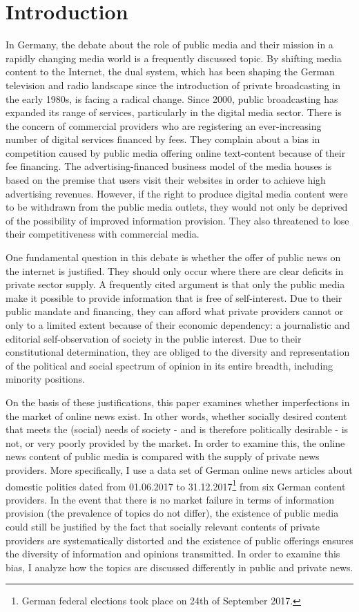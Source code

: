 \documentclass[12pt,a4paper,notitlepage]{article}
\begin{document}
\section{Introduction}

In Germany, the debate about the role of public media and their mission in a rapidly changing media world is a frequently discussed topic. By shifting media content to the Internet, the dual system, which has been shaping the German television and radio landscape since the introduction of private broadcasting in the early 1980s, is facing a radical change. Since 2000, public broadcasting has expanded its range of services, particularly in the digital media sector. There is the concern of commercial providers who are registering an ever-increasing number of digital services financed by fees. They complain about a bias in competition caused by public media offering online text-content because of their fee financing. The advertising-financed business model of the media houses is based on the premise that users visit their websites in order to achieve high advertising revenues. However, if the right to produce digital media content were to be withdrawn from the public media outlets, they would not only be deprived of the possibility of improved information provision. They also threatened to lose their competitiveness with commercial media.

One fundamental question in this debate is whether the offer of public news on the internet is justified. They should only occur where there are clear deficits in private sector supply. A frequently cited argument is that only the public media make it possible to provide information that is free of self-interest. Due to their public mandate and financing, they can afford what private providers cannot or only to a limited extent because of their economic dependency: a journalistic and editorial self-observation of society in the public interest. Due to their constitutional determination, they are obliged to the diversity and representation of the political and social spectrum of opinion in its entire breadth, including minority positions.

On the basis of these justifications, this paper examines whether imperfections in the market of online news exist. In other words, whether socially desired content that meets the (social) needs of society - and is therefore politically desirable - is not, or very poorly provided by the market. In order to examine this, the online news content of public media is compared with the supply of private news providers. More specifically, I use a data set of German online news articles about domestic politics dated from 01.06.2017 to 31.12.2017\footnote{German federal elections took place on 24th of September 2017.} from six German content providers. In the event that there is no market failure in terms of information provision (the prevalence of topics do not differ), the existence of public media could still be justified by the fact that socially relevant contents of private providers are systematically distorted and the existence of public offerings ensures the diversity of information and opinions transmitted. In order to examine this bias, I analyze how the topics are discussed differently in public and private news.
\end{document}
